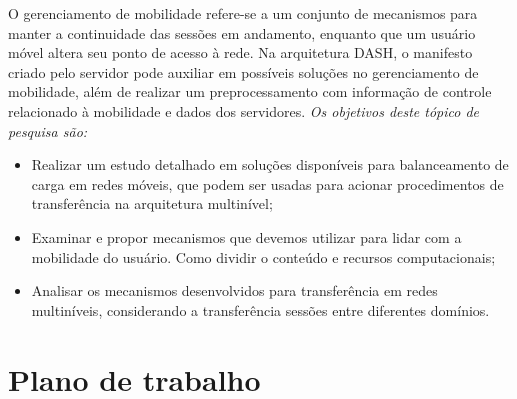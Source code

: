 O gerenciamento de mobilidade refere-se a um conjunto de mecanismos para manter a continuidade das sessões em andamento, enquanto que um usuário móvel altera seu ponto de acesso à rede.
Na arquitetura DASH, o manifesto criado pelo servidor pode auxiliar em possíveis soluções no gerenciamento de mobilidade, além de realizar um preprocessamento com informação de controle relacionado à mobilidade e dados dos servidores. 
\emph{Os objetivos deste tópico de pesquisa são:}

\begin{itemize}

\item Realizar um estudo detalhado em soluções disponíveis para balanceamento de carga em redes móveis, que podem ser usadas para acionar procedimentos de transferência na arquitetura multinível;

\item Examinar e propor mecanismos que devemos utilizar para lidar com a mobilidade do usuário.
Como dividir o conteúdo e recursos computacionais;

\item Analisar os mecanismos desenvolvidos para transferência em redes multiníveis, considerando a transferência sessões entre diferentes domínios.


\end{itemize}


\clearpage
\section{Plano de trabalho}
\label{sec:timetable}

